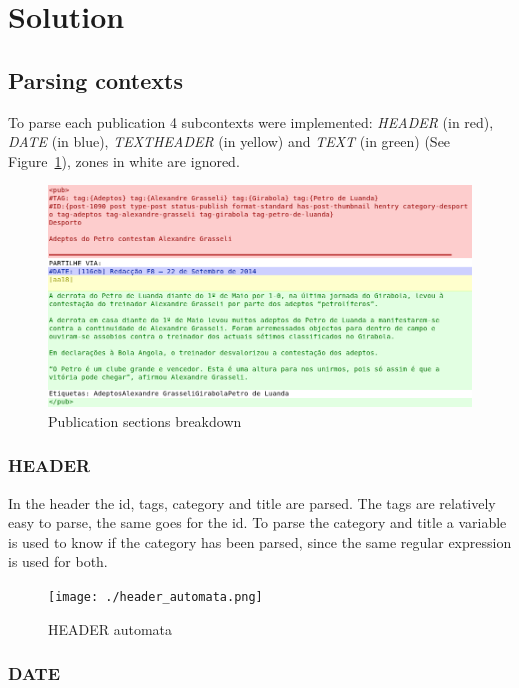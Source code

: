 \documentclass[a4paper]{article}
\begin{document}
\section{Solution}

\subsection{Parsing contexts}

To parse each publication 4 subcontexts were implemented: \textit{HEADER} (in
red), \textit{DATE} (in blue), \textit{TEXTHEADER} (in yellow) and
\textit{TEXT} (in green) (See Figure~\ref{fig:example_pub_colored}), zones in
white are ignored.

\begin{figure}[H]
    \includegraphics[width=\textwidth]{./example_pub_colored.png}
    \caption{Publication sections breakdown}\label{fig:example_pub_colored}
\end{figure}

\subsubsection{HEADER}

In the header the id, tags, category and title are parsed. The tags are
relatively easy to parse, the same goes for the id. To parse the category and
title a variable is used to know if the category has been parsed, since the
same regular expression is used for both.

\begin{figure}[H]
    \centering
    \texttt{[image: ./header\_automata.png]}
    \caption{HEADER automata}
\end{figure}

\subsubsection{DATE}
\end{document}
